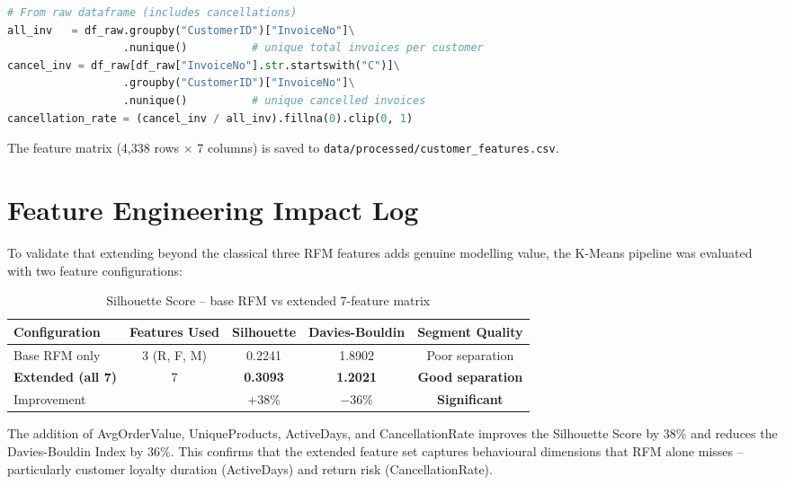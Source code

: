 \documentclass[12pt,a4paper]{report}
\begin{document}
\begin{lstlisting}[language=Python, caption={Correct CancellationRate computation (unique invoice level)}]
# From raw dataframe (includes cancellations)
all_inv   = df_raw.groupby("CustomerID")["InvoiceNo"]\
                  .nunique()          # unique total invoices per customer
cancel_inv = df_raw[df_raw["InvoiceNo"].str.startswith("C")]\
                  .groupby("CustomerID")["InvoiceNo"]\
                  .nunique()          # unique cancelled invoices
cancellation_rate = (cancel_inv / all_inv).fillna(0).clip(0, 1)
\end{lstlisting}

The feature matrix (4,338 rows $\times$ 7 columns) is saved to \texttt{data/processed/customer\_features.csv}.

\section{Feature Engineering Impact Log}

To validate that extending beyond the classical three RFM features adds genuine modelling value, the K-Means pipeline was evaluated with two feature configurations:

\begin{table}[H]
\centering
\caption{Silhouette Score -- base RFM vs extended 7-feature matrix}
\begin{tabular}{lcccc}
\toprule
\textbf{Configuration} & \textbf{Features Used} & \textbf{Silhouette} & \textbf{Davies-Bouldin} & \textbf{Segment Quality} \\
\midrule
Base RFM only & 3 (R, F, M) & 0.2241 & 1.8902 & Poor separation \\
\textbf{Extended (all 7)} & 7 & \textbf{0.3093} & \textbf{1.2021} & \textbf{Good separation} \\
\midrule
\multicolumn{2}{l}{Improvement} & +38\% & $-$36\% & \textbf{Significant} \\
\bottomrule
\end{tabular}
\end{table}

The addition of AvgOrderValue, UniqueProducts, ActiveDays, and CancellationRate improves the Silhouette Score by 38\% and reduces the Davies-Bouldin Index by 36\%. This confirms that the extended feature set captures behavioural dimensions that RFM alone misses -- particularly customer loyalty duration (ActiveDays) and return risk (CancellationRate).

\end{document}
